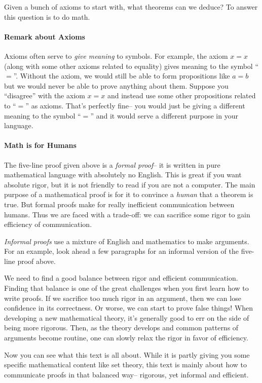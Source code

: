 \documentclass[12pt]{article}
\newcounter{theorem}
\begin{document}
Given a bunch of axioms to start with, what theorems can we deduce?
To answer this question is to do math.

\paragraph{Remark about Axioms}
Axioms often serve to \emph{give meaning} to symbols.
For example, the axiom $x=x$ (along with some other axioms related to equality)
gives meaning to the symbol ``$=$''.
Without the axiom, we would still be able to form propositions like $a=b$ but we would never be able to
prove anything about them.
Suppose you ``disagree'' with the axiom $x=x$ and instead use some other propositions related to ``$=$'' as axioms.
That's perfectly fine-- you would just be giving a different meaning to the symbol ``$=$'' and it would serve a different purpose in your language.

\paragraph{Math is for Humans}
The five-line proof given above is a \emph{formal proof}-- it is written in pure mathematical language
with absolutely no English.
This is great if you want absolute rigor, but
it is not friendly to read if you are not a computer.
The main purpose of a mathematical proof is for it to convince a \emph{human} that a theorem is true.
But formal proofs make for really inefficient communication between humans.
Thus we are faced with a trade-off: 
we can sacrifice some rigor to gain efficiency of communication.

\emph{Informal proofs} use a mixture of English and mathematics to make arguments.
For an example, look ahead a few paragraphs for an informal version of the five-line proof above.

We need to find a good balance between rigor and efficient communication.
Finding that balance is one of the great challenges when you first learn how to write proofs.
If we sacrifice too much rigor in an argument, then we can lose confidence in its correctness.
Or worse, we can start to prove false things!
When developing a new mathematical theory, it's generally good to err on the side of being more rigorous.
Then, as the theory develops and common patterns of arguments become routine,
one can slowly relax the rigor in favor of efficiency.

Now you can see what this text is all about.
While it is partly giving you some specific mathematical content like set theory,
this text is mainly about how to communicate proofs in that balanced way-- rigorous, yet informal and efficient.
\end{document}
